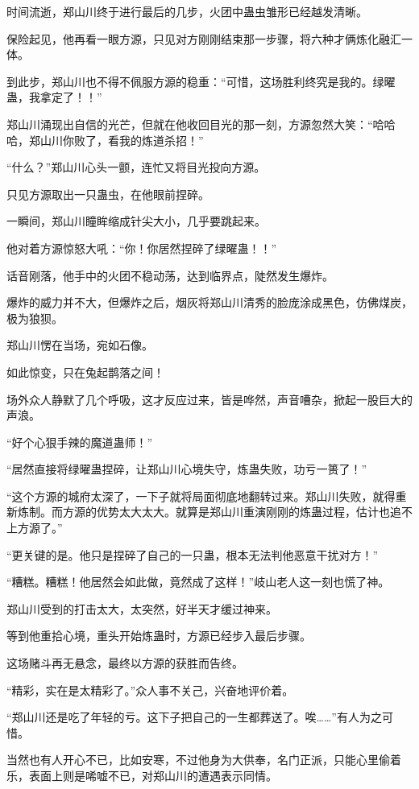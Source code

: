 
\begin{this_body}

时间流逝，郑山川终于进行最后的几步，火团中蛊虫雏形已经越发清晰。

保险起见，他再看一眼方源，只见对方刚刚结束那一步骤，将六种才俩炼化融汇一体。

到此步，郑山川也不得不佩服方源的稳重：“可惜，这场胜利终究是我的。绿曜蛊，我拿定了！！”

郑山川涌现出自信的光芒，但就在他收回目光的那一刻，方源忽然大笑：“哈哈哈，郑山川你败了，看我的炼道杀招！”

“什么？”郑山川心头一颤，连忙又将目光投向方源。

只见方源取出一只蛊虫，在他眼前捏碎。

一瞬间，郑山川瞳眸缩成针尖大小，几乎要跳起来。

他对着方源惊怒大吼：“你！你居然捏碎了绿曜蛊！！”

话音刚落，他手中的火团不稳动荡，达到临界点，陡然发生爆炸。

爆炸的威力并不大，但爆炸之后，烟灰将郑山川清秀的脸庞涂成黑色，仿佛煤炭，极为狼狈。

郑山川愣在当场，宛如石像。

如此惊变，只在兔起鹊落之间！

场外众人静默了几个呼吸，这才反应过来，皆是哗然，声音嘈杂，掀起一股巨大的声浪。

“好个心狠手辣的魔道蛊师！”

“居然直接将绿曜蛊捏碎，让郑山川心境失守，炼蛊失败，功亏一篑了！”

“这个方源的城府太深了，一下子就将局面彻底地翻转过来。郑山川失败，就得重新炼制。而方源的优势太大太大。就算是郑山川重演刚刚的炼蛊过程，估计也追不上方源了。”

“更关键的是。他只是捏碎了自己的一只蛊，根本无法判他恶意干扰对方！”

“糟糕。糟糕！他居然会如此做，竟然成了这样！”岐山老人这一刻也慌了神。

郑山川受到的打击太大，太突然，好半天才缓过神来。

等到他重拾心境，重头开始炼蛊时，方源已经步入最后步骤。

这场赌斗再无悬念，最终以方源的获胜而告终。

“精彩，实在是太精彩了。”众人事不关己，兴奋地评价着。

“郑山川还是吃了年轻的亏。这下子把自己的一生都葬送了。唉……”有人为之可惜。

当然也有人开心不已，比如安寒，不过他身为大供奉，名门正派，只能心里偷着乐，表面上则是唏嘘不已，对郑山川的遭遇表示同情。


\end{this_body}
